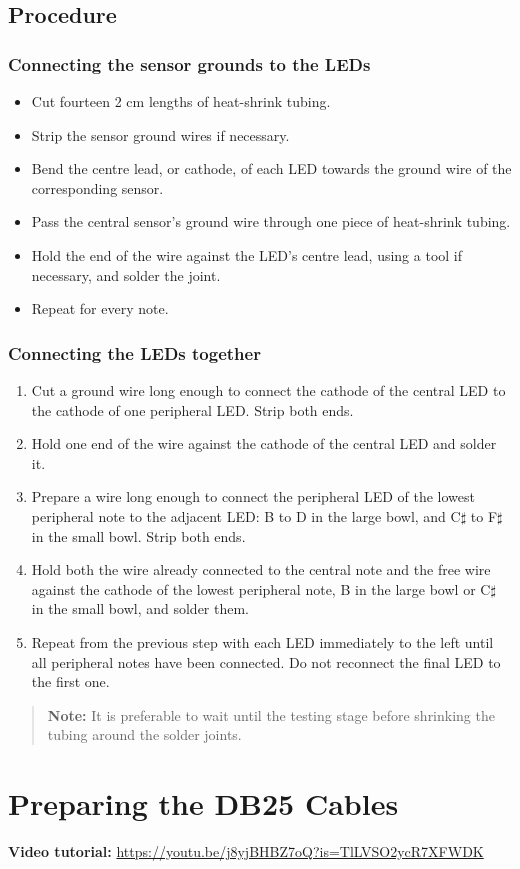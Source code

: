 \documentclass[11pt,a4paper]{article}
\newcommand{\tutorial}[1]{\textbf{Video tutorial:} \url{#1}}
\newcommand{\procedure}{\subsection{Procedure}}
\newcommand{\note}[1]{\begin{quote}\textbf{Note:} #1\end{quote}}
\begin{document}
\procedure
\subsubsection{Connecting the sensor grounds to the LEDs}
\begin{itemize}
  \item Cut fourteen 2 cm lengths of heat-shrink tubing.
  \item Strip the sensor ground wires if necessary.
  \item Bend the centre lead, or cathode, of each LED towards the ground wire of the corresponding sensor.
  \item Pass the central sensor's ground wire through one piece of heat-shrink tubing.
  \item Hold the end of the wire against the LED's centre lead, using a tool if necessary, and solder the joint.
  \item Repeat for every note.
\end{itemize}

\subsubsection{Connecting the LEDs together}
\begin{enumerate}
  \item Cut a ground wire long enough to connect the cathode of the central LED to the cathode of one peripheral LED. Strip both ends.
  \item Hold one end of the wire against the cathode of the central LED and solder it.
  \item Prepare a wire long enough to connect the peripheral LED of the lowest peripheral note to the adjacent LED: B to D in the large bowl, and C$\sharp$ to F$\sharp$ in the small bowl. Strip both ends.
  \item Hold both the wire already connected to the central note and the free wire against the cathode of the lowest peripheral note, B in the large bowl or C$\sharp$ in the small bowl, and solder them.
  \item Repeat from the previous step with each LED immediately to the left until all peripheral notes have been connected. Do not reconnect the final LED to the first one.
\end{enumerate}

\note{It is preferable to wait until the testing stage before shrinking the tubing around the solder joints.}

\section{Preparing the DB25 Cables}
\tutorial{https://youtu.be/j8yjBHBZ7oQ?is=TlLVSO2ycR7XFWDK}
\end{document}
